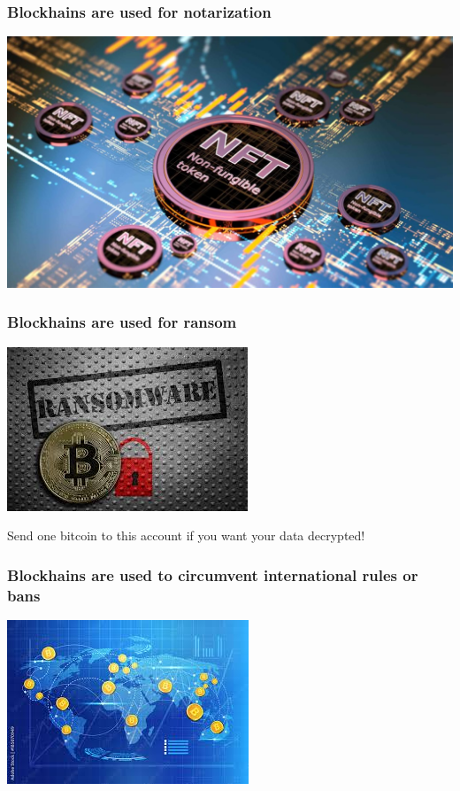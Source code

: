 \documentclass[11pt]{beamer}  %
\begin{document}
\begin{frame}\frametitle{Blockhains are used for notarization}

  \begin{center}
    \includegraphics[scale=0.258,clip=false]{pictures/nft.jpg}
  \end{center}

\end{frame}

\begin{frame}\frametitle{Blockhains are used for ransom}

  \begin{center}
    \includegraphics[scale=0.7, clip=false]{pictures/ransom.jpg}
  \end{center}

  \begin{redbox}{}
    Send one bitcoin to this account if you want your data decrypted!
  \end{redbox}

\end{frame}

\begin{frame}\frametitle{Blockhains are used to circumvent international rules or bans}

  \begin{center}
    \includegraphics[scale=1, clip=false]{pictures/send-money.jpg}
  \end{center}

\end{frame}
\end{document}
